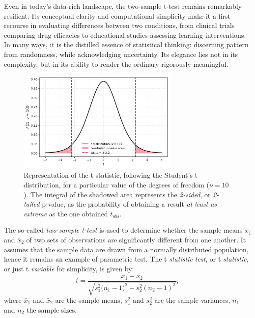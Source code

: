 \documentclass{book}
\begin{document}
Even in today’s data-rich landscape, the two-sample t-test remains remarkably resilient. Its conceptual clarity and computational simplicity make it a first recourse in evaluating differences between two conditions, from clinical trials comparing drug efficacies to educational studies assessing learning interventions. In many ways, it is the distilled essence of statistical thinking: discerning pattern from randomness, while acknowledging uncertainty. Its elegance lies not in its complexity, but in its ability to render the ordinary rigorously meaningful.\\

\begin{figure}[ht]
    \centering
    \includegraphics[width=0.7\textwidth]{figures/chapter4/t_test_1_sample_p_two_tailed.png}
    \caption{Representation of the t statistic, following the Student's t distribution, for a particular value of the degrees of freedom ($\nu = 10$). The integral of the shadowed area represents the \textit{2-sided}, or \textit{2-tailed} p-value, as the probability of obtaining a result \textit{at least as extreme} as the one obtained $t_{obs}$.}
    \label{fig:t_test2}
\end{figure}

The so-called \textit{two-sample t-test} is used to determine whether the sample means $\bar{x}_1$ and $\bar{x}_2$ of two sets of observations are significantly different from one another. It assumes that the sample data are drawn from a normally distributed population, hence it remains an example of parametric test. The t \textit{statistic test}, or t \textit{statistic}, or just t \textit{variable} for simplicity, is given by:
\begin{equation}
    t = \frac{\bar{x}_{1} - \bar{x}_{2}}{\sqrt{s^2_1 \big(n_{1} - 1)^{2} + s^2_2 (n_{2} - 1)^{2}}},
\end{equation}
where $\bar{x}_1$ and $\bar{x}_2$ are the sample means, $s^2_1$ and $s^2_2$ are the sample variances, $n_1$ and $n_2$ the sample sizes.\\
\end{document}
